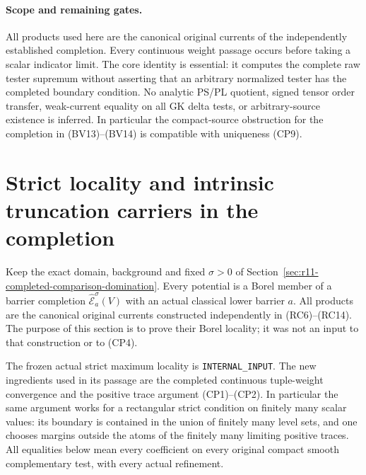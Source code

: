 \documentclass[11pt,a4paper]{article}
\numberwithin{equation}{section}
\theoremstyle{definition}
\theoremstyle{remark}
\begin{document}
\paragraph{Scope and remaining gates.}
All products used here are the canonical original currents of
the independently established completion. Every continuous
weight passage occurs before taking a scalar indicator limit.
The core identity is essential: it computes the complete raw
tester supremum without asserting that an arbitrary normalized
tester has the completed boundary condition. No analytic PS/PL
quotient, signed tensor order transfer, weak-current equality
on all GK delta tests, or arbitrary-source existence is inferred.
In particular the compact-source obstruction for the completion
in (BV13)--(BV14) is compatible with uniqueness (CP9).



\section{Strict locality and intrinsic truncation carriers in the completion}
\label{sec:r11-completed-locality-carriers}

Keep the exact domain, background and fixed $\sigma>0$ of
Section~\ref{sec:r11-completed-comparison-domination}.
Every potential is a Borel member of a barrier completion
$\widehat{\mathcal E}^\sigma_a(V)$ with an actual classical
lower barrier $a$. All products are the canonical original
currents constructed independently in (RC6)--(RC14).
The purpose of this section is to prove their Borel locality;
it was not an input to that construction or to (CP4).

The frozen actual strict maximum locality is
\texttt{INTERNAL\_INPUT}. The new ingredients used in its
passage are the completed continuous tuple-weight convergence
and the positive trace argument (CP1)--(CP2). In particular
the same argument works for a rectangular strict condition on
finitely many scalar values: its boundary is contained in the
union of finitely many level sets, and one chooses margins
outside the atoms of the finitely many limiting positive traces.
All equalities below mean every coefficient on every original
compact smooth complementary test, with every actual refinement.
\end{document}

